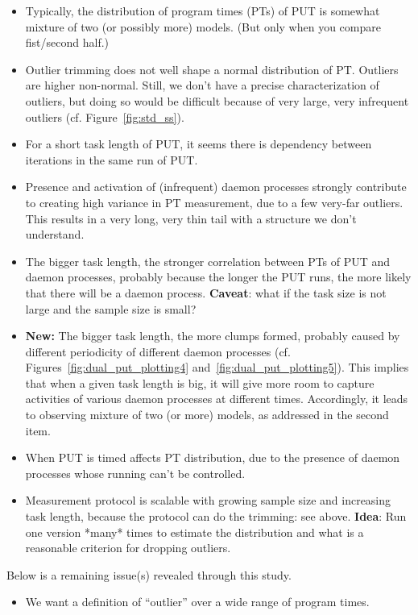 \documentclass[10pt]{article}
\begin{document}
\begin{itemize}

\item Typically, the distribution of program times (PTs) of PUT is somewhat mixture of two (or possibly more) models. (But only when you compare fist/second half.)
\item Outlier trimming does not well shape a normal distribution of PT. Outliers are higher non-normal. Still, we don't have a precise characterization of outliers, but doing so would be difficult because of very large, very infrequent outliers (cf. Figure~\ref{fig:std_ss}).
\item For a short task length of PUT, it seems there is dependency between iterations in the same run of PUT.
\item Presence and activation of (infrequent) daemon processes strongly contribute to creating high variance in PT
measurement, due to a few very-far outliers. This results in a very long, very thin tail with a structure we don't understand.
\item The bigger task length, the stronger correlation between PTs of PUT and daemon processes, probably because the longer the PUT runs, the more likely that there will be a daemon process. {\bf Caveat}: what if the task size is not large and the sample size is small?
\item {\bf New:} The bigger task length, the more clumps formed, probably caused by different periodicity of different daemon processes (cf. Figures~\ref{fig:dual_put_plotting4} and~\ref{fig:dual_put_plotting5}). This implies that when a given task length is big, it will give more room to capture activities of various daemon processes at different times. Accordingly, it leads to observing mixture of two (or more) models, as addressed in the second item. 
\item When PUT is timed affects PT distribution, due to the presence of daemon processes whose running
can't be controlled.
\item Measurement protocol is scalable with growing sample size and increasing task length, because the protocol can do the trimming: see above. {\bf Idea}: Run one version *many* times to estimate the distribution and what is a reasonable criterion for dropping outliers.

\end{itemize}

Below is a remaining issue(s) revealed through this study. 

\begin{itemize}

\item We want a definition of ``outlier'' over a wide range of program times.

\end{itemize}
\end{document}
